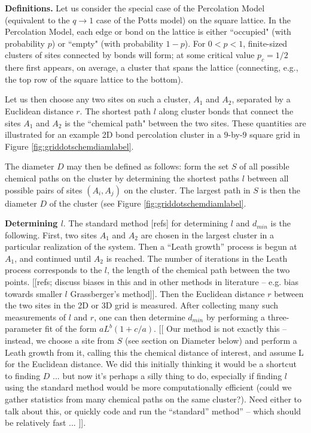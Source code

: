 \documentclass[aps, preprint, groupedaddress]{revtex4}
\begin{document}
{\bf Definitions.} Let us consider the special case of the Percolation Model (equivalent to the $q \to 1$ case of the Potts model) on the square lattice.  In the Percolation Model, each edge or bond on the lattice is either ``occupied" (with probability $p$) or ``empty" (with probability $1-p$). For $0 < p < 1$, finite-sized clusters of sites connected by bonds will form; at some critical value $p_c = 1/2$ there first appears, on average, a cluster that spans the lattice \cite{Stau96} (connecting, e.g., the top row of the square lattice to the bottom). 

Let us then choose any two sites on such a cluster, $A_1$ and $A_2$, separated by a Euclidean distance $r$.  The shortest path $l$ along cluster bonds that connect the sites $A_1$ and $A_2$ is the ``chemical path" \cite{HrHoSt84} between the two sites. These quantities are illustrated for an example 2D bond percolation cluster in a $9$-by-$9$ square grid in Figure \ref{fig:griddotschemdiamlabel}.

The diameter $D$ may then be defined as follows: form the set $S$ of all possible chemical paths on the cluster by determining the shortest paths $l$ between all possible pairs of sites $(A_i, A_j)$ on the cluster. The largest path in $S$ is then the diameter $D$ of the cluster (see Figure \ref{fig:griddotschemdiamlabel}.

{\bf Determining $l$}. The standard method [refs] for determining $l$ and $d_{min}$ is the following.  First, two sites $A_1$ and $A_2$ are chosen in the largest cluster in a particular realization of the system.  Then a ``Leath growth'' process is begun at $A_1$, and continued until $A_2$ is reached.  The number of iterations in the Leath process corresponds to the $l$, the length of the chemical path between the two points.  [[refs; discuss biases in this and in other methods in literature -- e.g. bias towards smaller $l$ Grassberger's method]]. Then the Euclidean distance $r$ between the two sites in the 2D or 3D grid is measured.  After collecting many such measurements of $l$ and $r$, one can then determine $d_{min}$ by performing a three-parameter fit of the form $a L ^ b (1+ c/a)$.  [[ Our method is not exactly this -- instead, we choose a site from $S$ (see section on Diameter below) and perform a Leath growth from it, calling this the chemical distance of interest, and assume L for the Euclidean distance. We did this initially thinking it would be a shortcut to finding $D$ ... but now it's perhaps a silly thing to do, especially if finding $l$ using the standard method would be more computationally efficient (could we gather statistics from many chemical paths on the same cluster?).  Need either to talk about this, or quickly code and run the ``standard'' method'' -- which should be relatively fast ... ]].   
\end{document}
